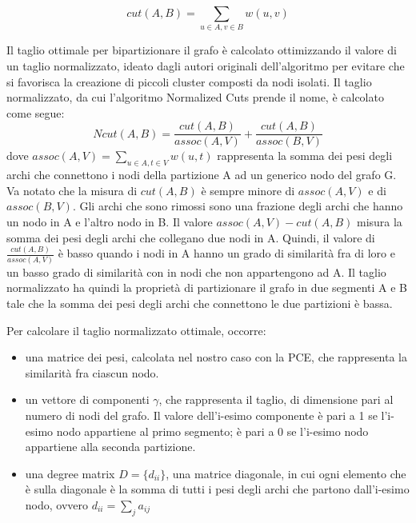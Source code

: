 \begin{equation}
cut(A,B) = \sum_{u\in A, v\in B} w(u, v)
\end{equation}

Il taglio ottimale per bipartizionare il grafo è calcolato ottimizzando il valore di un taglio normalizzato, ideato dagli autori originali dell'algoritmo per evitare che si favorisca la creazione di piccoli cluster composti da nodi isolati. Il taglio normalizzato, da cui l'algoritmo Normalized Cuts prende il nome, è calcolato come segue: 
\begin{equation}
Ncut(A,B) =  \frac{cut(A,B)}{assoc(A,V)} + \frac{cut(A,B)}{assoc(B,V)}
\end{equation}
dove $assoc(A,V) = \sum_{u\in A, t\in V} w(u,t) $ rappresenta la somma dei pesi degli archi che connettono i nodi della partizione A ad un generico nodo del grafo G.
Va notato che la misura di $cut(A,B)$ è sempre minore di $assoc(A,V)$ e di $assoc(B,V)$. Gli archi che sono rimossi sono una frazione degli archi che hanno un nodo in A e l'altro nodo in B. Il valore $assoc(A,V) - cut(A,B)$ misura la somma dei pesi degli archi che collegano due nodi in A. Quindi, il valore di $ \frac{cut(A,B)}{assoc(A,V)}$ è basso quando i nodi in A hanno un grado di similarità fra di loro e un basso grado di similarità con in nodi che non appartengono ad A. Il taglio normalizzato ha quindi la proprietà di partizionare il grafo in due segmenti A e B tale che la somma dei pesi degli archi che connettono le due partizioni è bassa.

Per calcolare il taglio normalizzato ottimale, occorre:
\begin{itemize}
\item una matrice dei pesi, calcolata nel nostro caso con la PCE, che rappresenta la similarità fra ciascun nodo.
\item un vettore di componenti $\gamma$, che rappresenta il taglio, di dimensione pari al numero di nodi del grafo. Il valore dell'i-esimo componente è pari a 1 se l'i-esimo nodo appartiene al primo segmento; è pari a 0 se l'i-esimo nodo appartiene alla seconda partizione.
\item una degree matrix $D = \lbrace d_{ii} \rbrace $, una matrice diagonale, in cui ogni elemento che è sulla diagonale è la somma di tutti i pesi degli archi che partono dall'i-esimo nodo, ovvero $d_{ii} = \sum_{j} a_{ij}$
\end{itemize}

